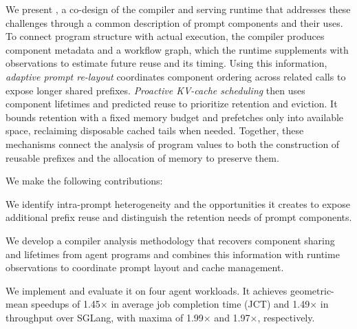 We present \sysname, a co-design of the compiler and serving runtime that addresses these challenges through a common description of prompt components and their uses. To connect program structure with actual execution, the compiler produces component metadata and a workflow graph, which the runtime supplements with observations to estimate future reuse and its timing. Using this information, \emph{adaptive prompt re-layout} coordinates component ordering across related calls to expose longer shared prefixes. \emph{Proactive KV-cache scheduling} then uses component lifetimes and predicted reuse to prioritize retention and eviction. It bounds retention with a fixed memory budget and prefetches only into available space, reclaiming disposable cached tails when needed. Together, these mechanisms connect the analysis of program values to both the construction of reusable prefixes and the allocation of memory to preserve them.

We make the following contributions:
\begin{enumerate*}[label=\textbf{(\roman*)}]
    \item We identify intra-prompt heterogeneity and the opportunities it creates to expose additional prefix reuse and distinguish the retention needs of prompt components.
    \item We develop a compiler analysis methodology that recovers component sharing and lifetimes from agent programs and combines this information with runtime observations to coordinate prompt layout and cache management.
    \item We implement \sysname and evaluate it on four agent workloads. It achieves geometric-mean speedups of 1.45$\times$ in average job completion time (JCT) and 1.49$\times$ in throughput over SGLang, with maxima of 1.99$\times$ and 1.97$\times$, respectively.
\end{enumerate*}
